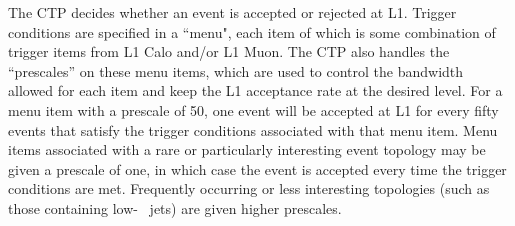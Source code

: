 The CTP decides whether an event is accepted or rejected at L1. Trigger conditions are specified in a ``menu",  each item of which is some combination of trigger items from L1 Calo and/or L1 Muon. The CTP also handles the ``prescales'' on these menu items, which are used to control the bandwidth allowed for each item and keep the L1 acceptance rate at the desired level. For a menu item with a prescale of 50, one event will be accepted at L1 for every fifty events that satisfy the trigger conditions associated with that menu item. Menu items associated with a rare or particularly interesting event topology may be given a prescale of one, in which case the event is accepted every time the trigger conditions are met. Frequently occurring or less interesting topologies (such as those containing low-\pt~ jets) are given higher prescales.  
%
%
%
%


